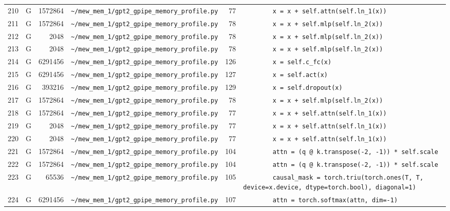\documentclass{article}
\begin{document}
\begin{longtable}{r l r p{6.5cm} r p{7.0cm}}
210 & G & 1572864 & \lstinline|~/mew_mem_1/gpt2_gpipe_memory_profile.py| & 77 & \lstinline|        x = x + self.attn(self.ln_1(x))| \\
211 & G & 1572864 & \lstinline|~/mew_mem_1/gpt2_gpipe_memory_profile.py| & 78 & \lstinline|        x = x + self.mlp(self.ln_2(x))| \\
212 & G & 2048 & \lstinline|~/mew_mem_1/gpt2_gpipe_memory_profile.py| & 78 & \lstinline|        x = x + self.mlp(self.ln_2(x))| \\
213 & G & 2048 & \lstinline|~/mew_mem_1/gpt2_gpipe_memory_profile.py| & 78 & \lstinline|        x = x + self.mlp(self.ln_2(x))| \\
214 & G & 6291456 & \lstinline|~/mew_mem_1/gpt2_gpipe_memory_profile.py| & 126 & \lstinline|        x = self.c_fc(x)| \\
215 & G & 6291456 & \lstinline|~/mew_mem_1/gpt2_gpipe_memory_profile.py| & 127 & \lstinline|        x = self.act(x)| \\
216 & G & 393216 & \lstinline|~/mew_mem_1/gpt2_gpipe_memory_profile.py| & 129 & \lstinline|        x = self.dropout(x)| \\
217 & G & 1572864 & \lstinline|~/mew_mem_1/gpt2_gpipe_memory_profile.py| & 78 & \lstinline|        x = x + self.mlp(self.ln_2(x))| \\
218 & G & 1572864 & \lstinline|~/mew_mem_1/gpt2_gpipe_memory_profile.py| & 77 & \lstinline|        x = x + self.attn(self.ln_1(x))| \\
219 & G & 2048 & \lstinline|~/mew_mem_1/gpt2_gpipe_memory_profile.py| & 77 & \lstinline|        x = x + self.attn(self.ln_1(x))| \\
220 & G & 2048 & \lstinline|~/mew_mem_1/gpt2_gpipe_memory_profile.py| & 77 & \lstinline|        x = x + self.attn(self.ln_1(x))| \\
221 & G & 1572864 & \lstinline|~/mew_mem_1/gpt2_gpipe_memory_profile.py| & 104 & \lstinline|        attn = (q @ k.transpose(-2, -1)) * self.scale| \\
222 & G & 1572864 & \lstinline|~/mew_mem_1/gpt2_gpipe_memory_profile.py| & 104 & \lstinline|        attn = (q @ k.transpose(-2, -1)) * self.scale| \\
223 & G & 65536 & \lstinline|~/mew_mem_1/gpt2_gpipe_memory_profile.py| & 105 & \lstinline|        causal_mask = torch.triu(torch.ones(T, T, device=x.device, dtype=torch.bool), diagonal=1)| \\
224 & G & 6291456 & \lstinline|~/mew_mem_1/gpt2_gpipe_memory_profile.py| & 107 & \lstinline|        attn = torch.softmax(attn, dim=-1)| \\

\end{longtable}
\end{document}
